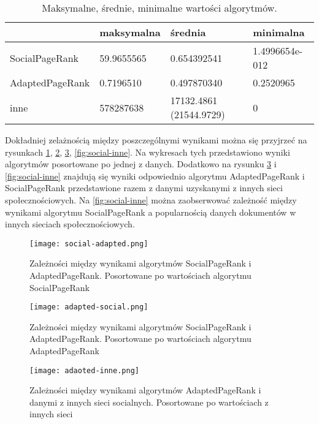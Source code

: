 \begin{table}[htb]
  \centering
    \begin{tabular}{ | l | l | l | l| }
\hline
  & maksymalna & średnia & minimalna \\
\hline
SocialPageRank    &  59.9655565  & 0.654392541 &  1.4996654e-012 \\
AdaptedPageRank &   0.7196510  & 0.497870340 &  0.2520965 \\
inne            & 578287638         & 17132.4861 (21544.9729)   & 0 \\
\hline
\end{tabular}
  \caption{ Maksymalne, średnie, minimalne wartości algorytmów. }
  \label{tab:rozne_wyniki}
\end{table}


Dokładniej zelażnością między poszczególnymi wynikami można się przyjrzeć na rysunkach \ref{fig:social-adapted}, \ref{fig:adapted-social}, \ref{fig:adapted-inne}, \ref{fig:social-inne}. Na wykresach tych przedstawiono wyniki algorytmów posortowane po jednej z danych. Dodatkowo na rysunku \ref{fig:adapted-inne} i \ref{fig:social-inne} znajdują się wyniki odpowiednio algorytmu AdaptedPageRank i SocialPageRank przedstawione razem z danymi uzyskanymi z innych sieci społecznościowych. Na \ref{fig:social-inne} można zaobserwować zależność między wynikami algorytmu SocialPageRank a popularnością danych dokumentów w innych sieciach społecznościowych.



\begin{figure}[htbp]

    \centering
    \texttt{[image: social-adapted.png]}
    \caption{Zależności między wynikami algorytmów SocialPageRank i AdaptedPageRank. Posortowane po wartościach algorytmu SocialPageRank}
    \label{fig:social-adapted}
\end{figure}

\begin{figure}[htbp]
    \centering
    \texttt{[image: adapted-social.png]}
    \caption{Zależności między wynikami algorytmów SocialPageRank i AdaptedPageRank. Posortowane po wartościach algorytmu AdaptedPageRank}
    \label{fig:adapted-social}

\end{figure}



\begin{figure}[htbp]

    \centering
    \texttt{[image: adaoted-inne.png]}
    \caption{Zależności między wynikami algorytmów AdaptedPageRank i danymi z innych sieci socialnych. Posortowane po wartościach z innych sieci}
    \label{fig:adapted-inne}
\end{figure}

